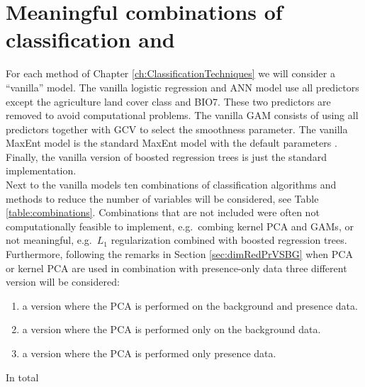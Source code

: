 \section{Meaningful combinations of classification and }
\label{sec:combinations}
 

For each method of Chapter \ref{ch:ClassificationTechniques} we will consider a ``vanilla'' model. The vanilla logistic regression and ANN model use all predictors except the agriculture land cover class and BIO7. These two predictors are removed to avoid computational problems. The vanilla GAM consists of using all predictors together with GCV to select the smoothness parameter. The vanilla MaxEnt model is the standard MaxEnt model with the default parameters \parencite{phillips_modeling_2008}. Finally, the vanilla version of boosted regression trees is just the standard implementation. \\

Next to the vanilla models ten combinations of classification algorithms and methods to reduce the number of variables will be considered, see Table \ref{table:combinations}. Combinations that are not included were often not computationally feasible to implement, e.g.\ combing kernel PCA and GAMs, or not meaningful, e.g.\ $L_1$ regularization combined with boosted regression trees. Furthermore, following the remarks in Section \ref{sec:dimRedPrVSBG} when PCA or kernel PCA are used in combination with presence-only data three different version will be considered: \begin{enumerate}
\item a version where the PCA is performed on the background and presence data.
\item a version where the PCA is performed only on the background data.
\item a version where the PCA is performed only presence data.
\end{enumerate}
In total 


